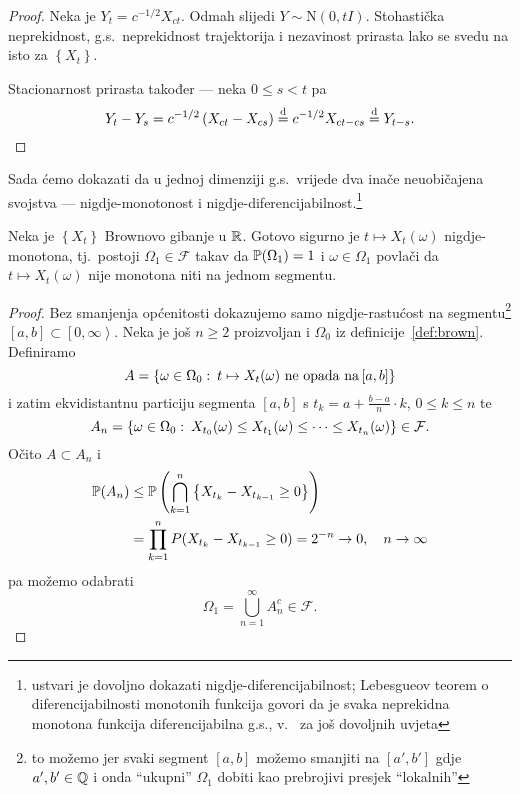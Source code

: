 \documentclass[main.tex]{subfiles}
\begin{document}
\begin{proof}
	Neka je \( Y_t = c^{-1/2}X_{ct} \). Odmah slijedi \( Y \sim \mathrm N(0, tI) \). Stohastička neprekidnost, g.s.\ neprekidnost trajektorija i nezavinost
	prirasta lako se svedu na isto za \( \left\{ X_t \right\} \).

	Stacionarnost prirasta također --- neka \( 0 \le s < t \) pa \[ Y_t - Y_s = c^{-1/2}\left( X_{ct} - X_{cs} \right) \jpod c^{-1/2}X_{ct-cs} \jpod Y_{t-s}. \]
\end{proof}

Sada ćemo dokazati da u jednoj dimenziji g.s.\ vrijede dva inače neuobičajena svojstva --- nigdje-monotonost i nigdje-diferencijabilnost.\footnote{ustvari je dovoljno dokazati nigdje-diferencijabilnost;
	Lebesgueov teorem o diferencijabilnosti monotonih funkcija govori da je svaka neprekidna monotona funkcija diferencijabilna g.s., v.~\cite[remark~5.10]{sato} za još dovoljnih uvjeta}

\begin{teorem} \label{tm:brown-nemonotonost}
	Neka je \( \left\{ X_t \right\} \) Brownovo gibanje u \( \R \). Gotovo sigurno je \( t \mapsto X_t(\omega) \) nigdje-monotona, tj.\
	postoji \( \Omega_1 \in \mathcal F \) takav da \( \P(\Omega_1)=1 \) i \( \omega \in \Omega_1 \) povlači da \( t \mapsto X_t(\omega) \)
	nije monotona niti na jednom segmentu.
\end{teorem}

\begin{proof}
	Bez smanjenja općenitosti dokazujemo samo nigdje-rastućost na segmentu\footnote{to možemo jer svaki segment \( \left[ a,b \right] \) možemo smanjiti na \( \left[ a',b' \right] \) gdje \( a',b'\in\Q \) i onda \enquote{ukupni} \( \Omega_1 \) dobiti kao prebrojivi presjek \enquote{lokalnih}} \( \left[ a,b \right] \subset \left[ 0,\infty \right\rangle \). Neka je još \( n \ge 2 \) proizvoljan i \( \Omega_0 \) iz definicije~\ref{def:brown}.
	Definiramo
	\begin{equation}
		A = \left\{ \omega \in \Omega_0 \st t \mapsto X_t(\omega) \mathrm{\ ne \ opada \ na } \left[ a,b \right] \right\}
	\end{equation}
	i zatim ekvidistantnu particiju segmenta \( \left[ a,b \right] \) s \( t_k = a + \frac{b-a}n \cdot k \), \( 0 \le k \le n  \) te
	\begin{equation}
		A_n = \left\{ \omega \in \Omega_0 \st X_{t_0}(\omega) \le X_{t_1}(\omega) \le \cdots \le X_{t_n}(\omega) \right\} \in \mathcal F.
	\end{equation}
	Očito \( A \subset A_n \) i
	\begin{align}
		\P(A_n) & \le \P\left(\bigcap_{k=1}^n \left\{ X_{t_k} - X_{t_{k-1}} \ge 0  \right\} \right) \\
		        & = \prod_{k=1}^n P(X_{t_k} - X_{t_{k-1}} \ge 0) = 2^{-n} \un, \quad n \ub
	\end{align}
	pa možemo odabrati
	\[
		\Omega_1 = \bigcup_{n=1}^\infty A_n^c \in \mathcal F.
	\]
\end{proof}
\end{document}
